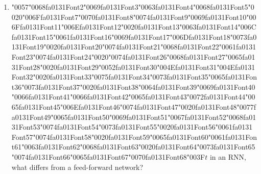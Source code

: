 \documentclass[12pt]{article}
\begin{document}
\begin{enumerate}[label=Q\arabic*.]
 \item {\char"0057}{\char"0068}{\csname fa0131Font2\endcsname\char"0069}{\csname fa0131Font3\endcsname\char"0063}{\csname fa0131Font4\endcsname\char"0068}{\csname fa0131Font5\endcsname\char"0020}{\char"006F}{\csname fa0131Font7\endcsname\char"0070}{\csname fa0131Font8\endcsname\char"0074}{\csname fa0131Font9\endcsname\char"0069}{\csname fa0131Font10\endcsname\char"006F}{\csname fa0131Font11\endcsname\char"006E}{\csname fa0131Font12\endcsname\char"0020}{\csname fa0131Font13\endcsname\char"0063}{\csname fa0131Font14\endcsname\char"006C}{\csname fa0131Font15\endcsname\char"0061}{\csname fa0131Font16\endcsname\char"0069}{\csname fa0131Font17\endcsname\char"006D}{\csname fa0131Font18\endcsname\char"0073}{\csname fa0131Font19\endcsname\char"0020}{\csname fa0131Font20\endcsname\char"0074}{\csname fa0131Font21\endcsname\char"0068}{\csname fa0131Font22\endcsname\char"0061}{\csname fa0131Font23\endcsname\char"0074}{\csname fa0131Font24\endcsname\char"0020}{\char"0074}{\csname fa0131Font26\endcsname\char"0068}{\csname fa0131Font27\endcsname\char"0065}{\csname fa0131Font28\endcsname\char"0020}{\csname fa0131Font29\endcsname\char"0052}{\csname fa0131Font30\endcsname\char"004E}{\csname fa0131Font31\endcsname\char"004E}{\csname fa0131Font32\endcsname\char"0020}{\csname fa0131Font33\endcsname\char"0075}{\csname fa0131Font34\endcsname\char"0073}{\csname fa0131Font35\endcsname\char"0065}{\csname fa0131Font36\endcsname\char"0073}{\csname fa0131Font37\endcsname\char"0020}{\csname fa0131Font38\endcsname\char"0064}{\csname fa0131Font39\endcsname\char"0069}{\csname fa0131Font40\endcsname\char"0066}{\csname fa0131Font41\endcsname\char"0066}{\csname fa0131Font42\endcsname\char"0065}{\csname fa0131Font43\endcsname\char"0072}{\csname fa0131Font44\endcsname\char"0065}{\csname fa0131Font45\endcsname\char"006E}{\csname fa0131Font46\endcsname\char"0074}{\csname fa0131Font47\endcsname\char"0020}{\csname fa0131Font48\endcsname\char"0077}{\csname fa0131Font49\endcsname\char"0065}{\csname fa0131Font50\endcsname\char"0069}{\csname fa0131Font51\endcsname\char"0067}{\csname fa0131Font52\endcsname\char"0068}{\csname fa0131Font53\endcsname\char"0074}{\csname fa0131Font54\endcsname\char"0073}{\csname fa0131Font55\endcsname\char"0020}{\csname fa0131Font56\endcsname\char"0061}{\csname fa0131Font57\endcsname\char"0074}{\csname fa0131Font58\endcsname\char"0020}{\csname fa0131Font59\endcsname\char"0065}{\csname fa0131Font60\endcsname\char"0061}{\csname fa0131Font61\endcsname\char"0063}{\csname fa0131Font62\endcsname\char"0068}{\csname fa0131Font63\endcsname\char"0020}{\csname fa0131Font64\endcsname\char"0073}{\csname fa0131Font65\endcsname\char"0074}{\csname fa0131Font66\endcsname\char"0065}{\csname fa0131Font67\endcsname\char"0070}{\csname fa0131Font68\endcsname\char"003F}$t$ in an RNN, what differs from a feed-forward network?

\end{enumerate}
\end{document}
